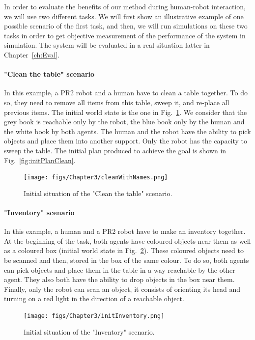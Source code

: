 \documentclass[english,a4paper,11pt,twoside]{StyleThese}
\begin{document}
In order to evaluate the benefits of our method during human-robot interaction, we will use two different tasks. We will first show an illustrative example of one possible scenario of the first task, and then, we will run simulations on these two tasks in order to get objective measurement of the performance of the system in simulation. The system will be evaluated in a real situation latter in Chapter~\ref{ch:Eval}.

\paragraph{"Clean the table" scenario}

In this example, a PR2 robot and a human have to clean a table together. To do so, they need to remove all items from this table, sweep it, and re-place all previous items. The initial world state is the one in Fig.~\ref{fig:initClean}. We consider that the grey book is reachable only by the robot, the blue book only by the human and the white book by both agents. The human and the robot have the ability to pick objects and place them into another support. Only the robot has the capacity to sweep the table. The initial plan produced to achieve the goal is shown in Fig.~\ref{fig:initPlanClean}.

\begin{figure}[!h]
	\centering
    \texttt{[image: figs/Chapter3/cleanWithNames.png]}
    \caption{Initial situation of the "Clean the table" scenario.}
    \label{fig:initClean}
\end{figure}

\paragraph{"Inventory" scenario}

In this example, a human and a PR2 robot have to make an inventory together. At the beginning of the task, both agents have coloured objects near them as well as a coloured box (initial world state in Fig.~\ref{fig:initInventory}). These coloured objects need to be scanned and then, stored in the box of the same colour. To do so, both agents can pick objects and place them in the table in a way reachable by the other agent. They also both have the ability to drop objects in the box near them. Finally, only the robot can scan an object, it consists of orienting its head and turning on a red light in the direction of a reachable object. 

\begin{figure}[!h]
	\centering
    \texttt{[image: figs/Chapter3/initInventory.png]}
    \caption{Initial situation of the "Inventory" scenario.}
    \label{fig:initInventory}
\end{figure}
\end{document}
